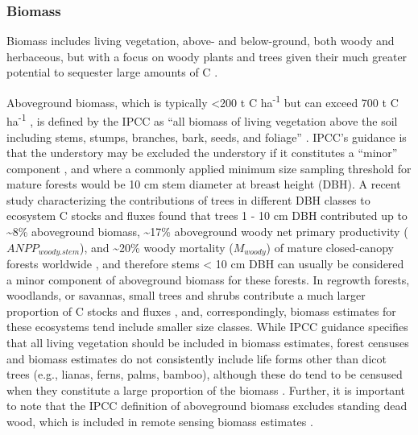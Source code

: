 \documentclass[, manuscript]{copernicus}
\begin{document}
\subsubsection{Biomass}

Biomass includes living vegetation, above- and below-ground, both woody
and herbaceous, but with a focus on woody plants and trees given their
much greater potential to sequester large amounts of C
\citep{ipcc_2006_2006}.

Aboveground biomass, which is typically \textless200 t C
ha\textsuperscript{-1} but can exceed 700 t C ha\textsuperscript{-1}
\citep{anderson-teixeira_carbon_2021}, is defined by the IPCC as ``all
biomass of living vegetation above the soil including stems, stumps,
branches, bark, seeds, and foliage''
\citep{ipcc_good_2003, ipcc_2006_2006}. IPCC's guidance is that the
understory may be excluded the understory if it constitutes a ``minor''
component \citep[defined as \textless{} 25 - 30 \% of emissions/removals
for the overall category,][]{ipcc_2006_2006}, and where a commonly
applied minimum size sampling threshold for mature forests would be 10
cm stem diameter at breast height (DBH). A recent study characterizing
the contributions of trees in different DBH classes to ecosystem C
stocks and fluxes found that trees 1 - 10 cm DBH contributed up to
\textasciitilde8\% aboveground biomass, \textasciitilde17\% aboveground
woody net primary productivity (\(ANPP_{woody.stem}\)), and
\textasciitilde20\% woody mortality (\(M_{woody}\)) of mature
closed-canopy forests worldwide \citep{piponiot_distribution_2022}, and
therefore stems \textless{} 10 cm DBH can usually be considered a minor
component of aboveground biomass for these forests. In regrowth forests,
woodlands, or savannas, small trees and shrubs contribute a much larger
proportion of C stocks and fluxes
\citep{lutz_global_2018, piponiot_distribution_2022, hughes_biomass_1999},
and, correspondingly, biomass estimates for these ecosystems tend
include smaller size classes. While IPCC guidance specifies that all
living vegetation should be included in biomass estimates, forest
censuses and biomass estimates do not consistently include life forms
other than dicot trees (e.g., lianas, ferns, palms, bamboo), although
these do tend to be censused when they constitute a large proportion of
the biomass \citep[e.g.,][]{fukushima_recovery_2007}. Further, it is
important to note that the IPCC definition of aboveground biomass
excludes standing dead wood, which is included in remote sensing biomass
estimates \citep{duncanson_aboveground_2021}.
\end{document}
